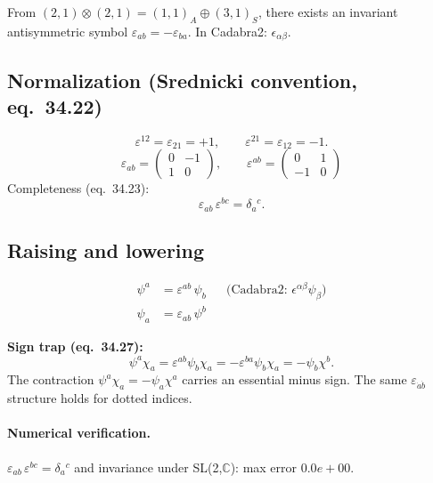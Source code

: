 \documentclass[12pt]{article}
\newcommand{\verified}[1]{\textcolor{verifygreen}{\checkmark\; #1}}
\begin{document}
From $(2,1)\otimes(2,1) = (1,1)_A \oplus (3,1)_S$, there exists
an invariant antisymmetric symbol $\varepsilon_{ab} = -\varepsilon_{ba}$.
In Cadabra2: $\epsilon_{\alpha \beta}$.

\subsection{Normalization (Srednicki convention, eq.~34.22)}
\begin{equation}
  \varepsilon^{12} = \varepsilon_{21} = +1,\qquad
  \varepsilon^{21} = \varepsilon_{12} = -1.
\end{equation}
\[
  \varepsilon_{ab} = \begin{pmatrix}0 & -1 \\ 1 & 0\end{pmatrix},\qquad
  \varepsilon^{ab} = \begin{pmatrix}0 & 1 \\ -1 & 0\end{pmatrix}
\]
Completeness (eq.~34.23):
\begin{equation}
  \varepsilon_{ab}\,\varepsilon^{bc} = \delta_a{}^c.
\end{equation}

\subsection{Raising and lowering}
\begin{align}
  \psi^a &= \varepsilon^{ab}\,\psi_b
  &&\text{(Cadabra2: } \epsilon^{\alpha \beta} \psi_{\beta}\text{)} \\
  \psi_a &= \varepsilon_{ab}\,\psi^b
\end{align}

\noindent\textbf{Sign trap (eq.~34.27):}
\begin{equation}
  \psi^a\chi_a = \varepsilon^{ab}\psi_b\chi_a
  = -\varepsilon^{ba}\psi_b\chi_a = -\psi_b\chi^b.
\end{equation}
The contraction $\psi^a\chi_a = -\psi_a\chi^a$ carries an essential minus sign.
The same $\varepsilon_{\dot{a}\dot{b}}$ structure holds for dotted indices.

\paragraph{Numerical verification.}
\verified{$\varepsilon_{ab}\,\varepsilon^{bc} = \delta_a{}^c$ and invariance under SL(2,$\mathbb{C}$): max error $0.0e+00$.}

\end{document}
